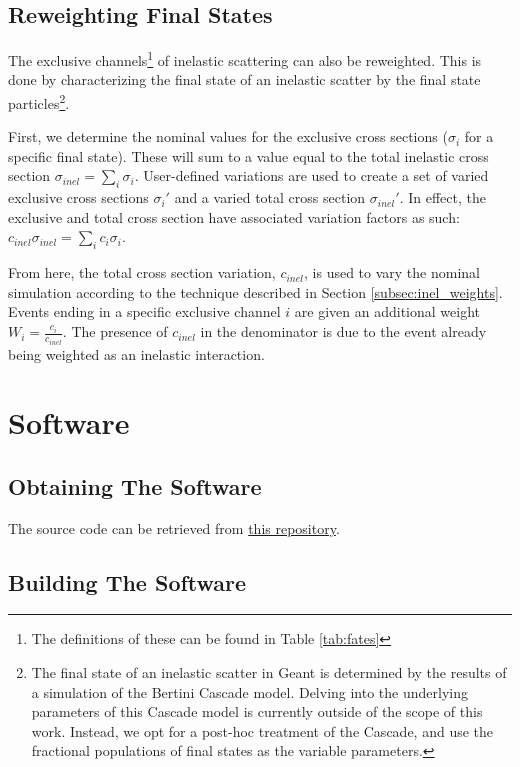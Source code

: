 \documentclass[12pt]{article}
\begin{document}
\subsection{Reweighting Final States}\label{subsec:fs_rw}
The exclusive channels\footnote{The definitions of these can be found in Table \ref{tab:fates}} of inelastic scattering can also be reweighted. This is done by characterizing the final state of an inelastic scatter by the final state particles\footnote{The final state of an inelastic scatter in Geant is determined by the results of a simulation of the Bertini Cascade model. Delving into the underlying parameters of this Cascade model is currently outside of the scope of this work. Instead, we opt for a post-hoc treatment of the Cascade, and use the fractional populations of final states as the variable parameters.}. 

First, we determine the nominal values for the exclusive cross sections ($\sigma_{i}$ for a specific final state). These will sum to a value equal to the total inelastic cross section $\sigma_{inel} = \sum\limits_{i}\sigma_{i}$. User-defined variations are used to create a set of varied exclusive cross sections $\sigma_{i}'$ and a varied total cross section $\sigma_{inel}'$. In effect, the exclusive and total cross section have associated variation factors as such: $c_{inel}\sigma_{inel}  = \sum\limits_{i} c_{i} \sigma_{i}$. 

From here, the total cross section variation, $c_{inel}$, is used to vary the nominal simulation according to the technique described in Section \ref{subsec:inel_weights}. Events ending in a specific exclusive channel $i$ are given an additional weight $W_{i} = \frac{c_i}{c_{inel}}$. The presence of $c_{inel}$ in the denominator is due to the event already being weighted as an inelastic interaction. 


\section{Software}

\subsection{Obtaining The Software}

The source code can be retrieved from \href{https://github.com/calcuttj/GeantReweight}{this repository}.

\subsection{Building The Software}
\end{document}
